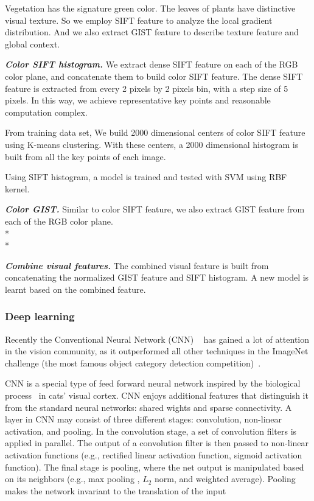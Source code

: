 \documentclass[10pt,journal,compsoc]{IEEEtran}
\begin{document}
Vegetation has the signature green color. 
The leaves of plants have distinctive visual texture. 
So we employ SIFT feature to analyze the local gradient distribution. 
And we also extract GIST feature to describe texture feature and global context. 





\textbf{\textit{Color SIFT histogram.}}
We extract dense SIFT feature on each of the RGB color plane, and concatenate them to build color SIFT feature. The dense SIFT feature is extracted from every 2 pixels by 2 pixels bin, with a step size of 5 pixels. In this way, we achieve representative key points and reasonable computation complex. 

From training data set, We build 2000 dimensional centers of color SIFT feature using K-means clustering. With these centers, a 2000 dimensional histogram is built from all the key points of each image.

Using SIFT histogram, a model is trained and tested with SVM using RBF kernel. 

\textbf{\textit{Color GIST.}}
Similar to color SIFT feature, we also extract GIST feature from each of the RGB color plane.\\*\\*

\textbf{\textit{Combine visual features.}}
The combined visual feature is built from concatenating the normalized GIST feature and SIFT histogram. A new model is learnt based on the combined feature.

\subsubsection{Deep learning}
Recently the Conventional Neural Network (CNN) ~\cite{krizhevsky2012imagenet} has gained a lot of attention in the vision community, as it outperformed all other techniques in the ImageNet challenge (the most famous object category detection competition)~\cite{ilsvrcarxiv14}.



CNN is a special type of feed forward neural network inspired by the biological process~\cite{krizhevsky2012imagenet} in cats' visual cortex. 
CNN enjoys additional features that distinguish it from the standard neural networks: shared wights and sparse connectivity.
A layer in CNN may consist of three different stages: convolution, non-linear activation, and pooling.
In the convolution stage, a set of convolution filters is applied in parallel. 
The output of a convolution filter is then passed to non-linear activation functions (e.g., rectified linear activation function, sigmoid activation function).
The final stage is pooling, where the net output is manipulated based on its neighbors (e.g., max pooling , $L_2$ norm, and weighted average).
Pooling makes the network invariant to the translation of the input
\end{document}

